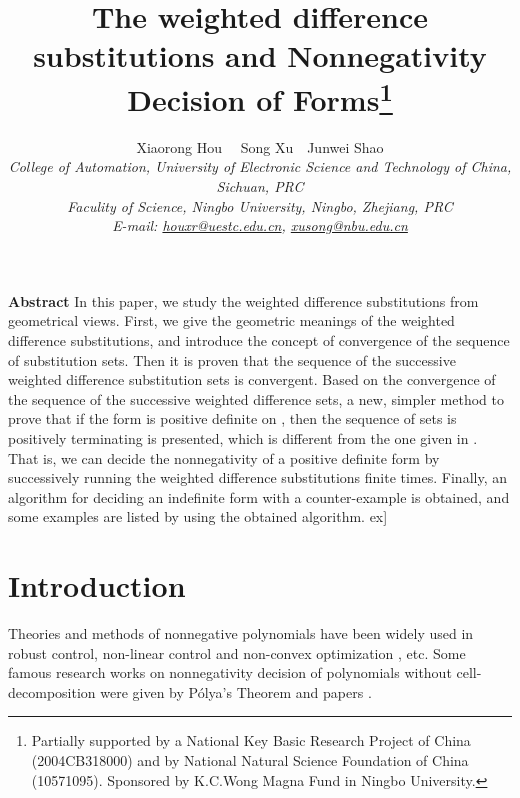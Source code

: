 \documentclass [10pt,a4paper]{article}
\begin{document}
\newtheorem{theorem}{Theorem}[section]
\newtheorem{definition}{Def\mbox{}inition}[section]
\newtheorem{lemma}{Lemma}[section]
\newtheorem{corollary}{Corollary}[section]


\title{The weighted dif\mbox{}ference substitutions and Nonnegativity Decision of Forms\footnote{ Partially supported by a
National Key Basic Research Project of China (2004CB318000) and by
National Natural Science Foundation of China (10571095). Sponsored
by K.C.Wong Magna Fund in Ningbo University. }}
\date{}

\author{
 Xiaorong Hou~~ Song Xu~~Junwei Shao\\
 \textit{\small  College of Automation,
University of Electronic Science and Technology of China, Sichuan,
PRC}\\
 \textit{\small  Faculity of Science, Ningbo University, Ningbo,
Zhejiang, PRC}\\
\textit{\small E-mail:
\href{mailto:houxr@uestc.edu.cn}{houxr@uestc.edu.cn},
\href{mailto:xusong@nbu.edu.cn}{xusong@nbu.edu.cn} }}


 \maketitle
{\noindent\small  {\bf Abstract} In this paper, we study the
weighted dif\mbox{}ference substitutions from geometrical views.
First, we give the geometric meanings of the weighted
dif\mbox{}ference substitutions, and introduce the concept of
convergence of the sequence of substitution sets.    Then it is
proven that the
 sequence of the successive
weighted dif\mbox{}ference substitution sets is convergent.  Based
on the convergence
 of the sequence of the successive weighted
dif\mbox{}ference sets,  a new, simpler method to prove that if the
form   is positive def\mbox{}inite on , then the
sequence of  sets  is
positively terminating is presented,  which is dif\mbox{}ferent from
the one given in \cite{Yong:1}. That is, we can decide the
nonnegativity of a positive definite form by
 successively running the weighted
dif\mbox{}ference substitutions finite times. Finally, an algorithm
for deciding an indef\mbox{}inite form with a counter-example  is
obtained, and
 some examples are listed  by using the obtained algorithm.  }\2ex]




\section{ Introduction }
Theories and methods of nonnegative polynomials have been  widely
used in  robust control, non-linear control and non-convex
optimization \cite{P:1,P:2,J:1}, etc.   Some famous research works
on nonnegativity decision of polynomials without cell-decomposition
were given  by P\'{o}lya's Theorem \cite{Po:1,G:1} and papers
\cite{Ca:1,H:2}.
\end{document}
